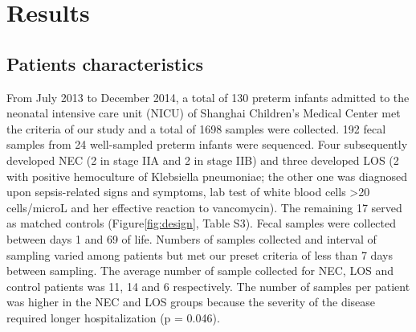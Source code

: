 \documentclass[fleqn,10pt, lineno]{wlpeerj} %
\begin{document}
\section*{Results}
  \subsection*{Patients characteristics}
   From July 2013 to December 2014, a total of 130 preterm infants admitted to the neonatal intensive care unit (NICU) of Shanghai Children’s Medical Center met the criteria of our study and a total of 1698 samples were collected. 192 fecal samples from 24 well-sampled preterm infants were sequenced. Four subsequently developed NEC (2 in stage IIA and 2 in stage IIB) and three developed LOS (2 with positive hemoculture of Klebsiella pneumoniae; the other one was diagnosed upon sepsis-related signs and symptoms, lab test of white blood cells \textgreater 20 cells/microL and her effective reaction to vancomycin).  The remaining 17 served as matched controls (Figure\ref{fig:design}, Table S3). Fecal samples were collected between days 1 and 69 of life. Numbers of samples collected and interval of sampling varied among patients but met our preset criteria of less than 7 days between sampling. The average number of sample collected for NEC, LOS and control patients was 11, 14 and 6 respectively. The number of samples per patient was higher in the NEC and LOS groups because the severity of the disease required longer hospitalization (p = 0.046).

\end{document}
